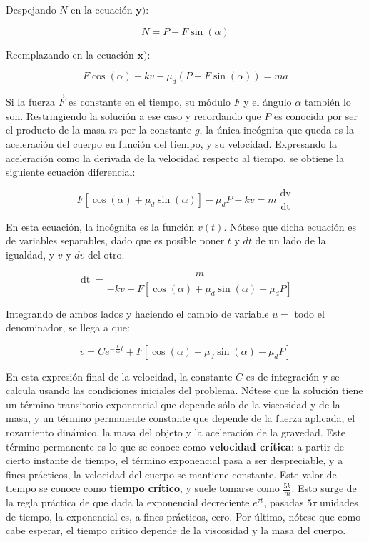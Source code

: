 \documentclass{article}
\begin{document}
Despejando $N$ en la ecuación $\textbf{y)}$:

\begin{equation}
N = P - F \sin(\alpha)
\end{equation}

Reemplazando en la ecuación $\textbf{x)}$:

\begin{equation}
F \cos(\alpha) - k v - \mu_d (P - F \sin(\alpha)) = m a
\end{equation}

Si la fuerza $\vec{F}$ es constante en el tiempo, su módulo $F$ y el ángulo $\alpha$ también lo son. Restringiendo la solución a ese caso y recordando que $P$ es conocida por ser el producto de la masa $m$ por la constante $g$, la única incógnita que queda es la aceleración del cuerpo en función del tiempo, y su velocidad. Expresando la aceleración como la derivada de la velocidad respecto al tiempo, se obtiene la siguiente ecuación diferencial:

\begin{equation}
F [\cos(\alpha) + \mu_d \sin(\alpha)] - \mu_d P - k v = m \frac{\mathop{dv}}{\mathop{dt}}
\end{equation}

En esta ecuación, la incógnita es la función $v(t)$. Nótese que dicha ecuación es de variables separables, dado que es posible poner $t$ y $dt$ de un lado de la igualdad, y $v$ y $dv$ del otro.

\begin{equation}
\mathop{dt} = \frac{m}{-k v + F [\cos(\alpha) + \mu_d \sin(\alpha) - \mu_d P]}
\end{equation}

Integrando de ambos lados y haciendo el cambio de variable $u = $ todo el denominador, se llega a que:

\begin{equation}
v = C e^{-\frac{k}{m} t} + F [\cos(\alpha) + \mu_d \sin(\alpha) - \mu_d P]
\end{equation}

En esta expresión final de la velocidad, la constante $C$ es de integración y se calcula usando las condiciones iniciales del problema. Nótese que la solución tiene un término transitorio exponencial que depende sólo de la viscosidad y de la masa, y un término permanente constante que depende de la fuerza aplicada, el rozamiento dinámico, la masa del objeto y la aceleración de la gravedad. Este término permanente es lo que se conoce como \textbf{velocidad crítica}: a partir de cierto instante de tiempo, el término exponencial pasa a ser despreciable, y a fines prácticos, la velocidad del cuerpo se mantiene constante. Este valor de tiempo se conoce como \textbf{tiempo crítico}, y suele tomarse como $\frac{5k}{m}$. Esto surge de la regla práctica de que dada la exponencial decreciente $e^{\tau t}$, pasadas $5 \tau$ unidades de tiempo, la exponencial es, a fines prácticos, cero. Por último, nótese que como cabe esperar, el tiempo crítico depende de la viscosidad y la masa del cuerpo.
\end{document}
